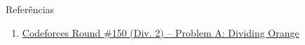 \begin{frame}[fragile]{Referências}

    \begin{enumerate}
        \item \href{https://codeforces.com/problemset/problem/244/A}{Codeforces Round \#150 (Div. 2) -- Problem A: Dividing Orange}

    \end{enumerate}

\end{frame}
